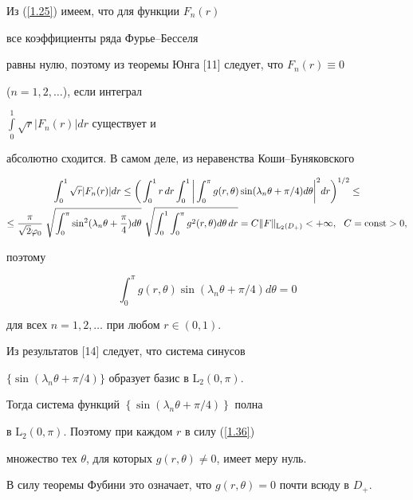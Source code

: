 Из (\ref{1.25}) имеем, что для функции $F_n(r)$ 


все коэффициенты ряда Фурье--Бесселя


равны нулю, поэтому из теоремы Юнга [11] следует, что  $F_n(r)\equiv 0$


($n=1,2,\dotsc$), если интеграл 


${\int\limits_0^1\sqrt r|F_n(r)|dr}$ существует и


абсолютно сходится. В самом деле, из неравенства Коши--Буняковского


\begin{gather*}


\int_0^1\sqrt r|F_n(r)|dr\le\bigg(\int_0^1r\,dr\int_0^1\bigg|


\int_0^{\pi} g(r,\theta)\sin(\lambda_n\theta+\pi/4)d\theta


\bigg|^2dr\bigg)^{1/2}\le \\


%


\le\frac{\pi}{\sqrt2\varphi_0}\;\sqrt{\int_0^{\pi}\sin^2(\lambda_n


\theta+\frac\pi 4)d\theta}


\ \sqrt{\int_0^1\int_0^{\pi}g^2(r,\theta)d\theta\,dr}=


C\| F\|_{\mathrm L_2(D_+)}<+\infty,\ \ C=\const>0,


\end{gather*}


поэтому


\begin{equation}


\int_0^{\pi}g(r,\theta)\sin(\lambda_n\theta+\pi/4)d\theta=0\label{1.36}


\end{equation}


для всех $n=1,2,\dotsc$ при любом $r\in(0,1)$.


Из результатов [14] следует, что система синусов


$\{\sin(\lambda_n\theta +\pi/4)\}$ образует базис в ${\mathrm L_2}(0,\pi)$.


Тогда система функций $\left\{\sin(\lambda_n\theta+\pi/4)\right\}$ полна


в ${\mathrm L}_2(0,\pi)$. Поэтому при каждом $r$ в силу (\ref{1.36})


множество тех $\theta$, для которых $g(r,\theta)\ne 0$, имеет меру нуль.


В силу теоремы Фубини это означает, что $g(r,\theta)=0$ почти всюду в $D_+$.





